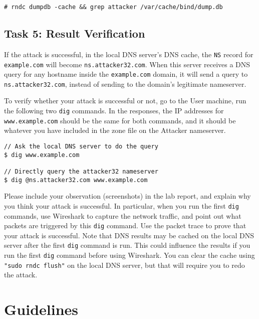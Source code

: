 \begin{lstlisting}
# rndc dumpdb -cache && grep attacker /var/cache/bind/dump.db
\end{lstlisting}
 

\subsection{Task 5: Result Verification}

If the attack is successful, in the local DNS server's DNS cache, 
the {\tt NS} record for \texttt{example.com} will become 
\texttt{ns.attacker32.com}.
When this server receives a DNS query for any hostname
inside the \texttt{example.com} domain,  it will
send a query to \texttt{ns.attacker32.com}, instead of 
sending to the domain's legitimate nameserver. 


To verify whether your attack is successful or not, 
go to the User machine, run the following two
\texttt{dig} commands. In the responses, the IP addresses for 
\texttt{www.example.com} should be the same for both 
commands, and it should be whatever you have included
in the zone file on the Attacker nameserver. 

\begin{lstlisting}
// Ask the local DNS server to do the query
$ dig www.example.com

// Directly query the attacker32 nameserver
$ dig @ns.attacker32.com www.example.com
\end{lstlisting}
 
Please include your observation (screenshots) in the lab 
report, and explain why you think your attack is successful. 
In particular, when you run the first \texttt{dig} commands,
use Wireshark to capture the network traffic, and 
point out what packets are triggered by this
\texttt{dig} command. Use the packet trace to 
prove that your attack is successful. Note that DNS results
may be cached on the local DNS server after the first
\texttt{dig} command is run. This could influence the
results if you run the first \texttt{dig} command before using
Wireshark. You can clear the cache using \texttt{"sudo rndc flush"} 
on the local DNS server, but that will 
require you to redo the attack.



\section{Guidelines} 

